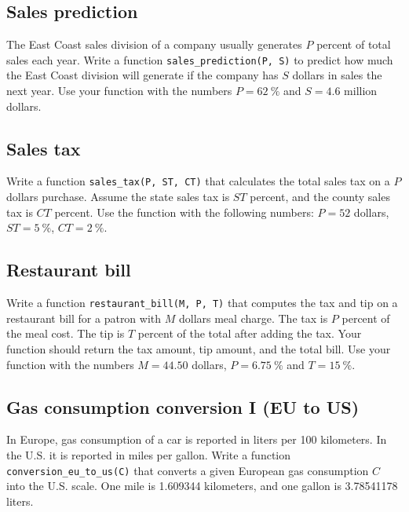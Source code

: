
\subsection{Sales prediction}

The East Coast sales division of a company usually generates $P$
percent of total sales each year. Write a function {\tt sales\_prediction(P, S)} to predict how much 
the East Coast division will generate if the company has $S$ dollars in sales the next year. 
Use your function with the numbers $P = 62\ \%$ and $S = 4.6$ million dollars. 


\subsection{Sales tax}

Write a function {\tt sales\_tax(P, ST, CT)} that calculates the total sales tax on a $P$ dollars purchase. 
Assume the state sales tax is $ST$ percent, and the county sales tax is $CT$ percent. Use the
function with the following numbers: $P = 52$ dollars, $ST = 5 \ \%$, $CT = 2 \ \%$.


\subsection{Restaurant bill}

Write a function {\tt restaurant\_bill(M, P, T)} 
that computes the tax and tip on a restaurant bill for a patron with 
$M$ dollars meal charge. The tax is $P$ percent of the meal cost. 
The tip is $T$ percent of the total after 
adding the tax. Your function should return the tax amount, tip amount, and the total bill. 
Use your function with the numbers $M = 44.50$ dollars, $P = 6.75 \ \%$ and $T = 15 \ \%$. 


\subsection{Gas consumption conversion I (EU to US)}

In Europe, gas consumption of a car is reported in liters per 100 kilometers. In the U.S. 
it is reported in miles per gallon. Write a function {\tt conversion\_eu\_to\_us(C)} that converts a given European 
gas consumption $C$ into the U.S. scale. One mile is 1.609344 kilometers, and one gallon is 3.78541178 liters. 

